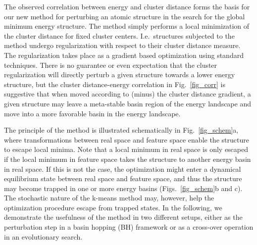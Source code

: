 \documentclass[aip,amsmath,amssymb,reprint]{revtex4-1}
\begin{document}
The observed correlation between energy and cluster distance forms the
basis for our new method for perturbing an atomic structure in the
search for the global minimum energy structure. The method simply
performs a local minimization of the cluster distance for fixed
cluster centers. I.e.\ structures subjected to the method undergo
regularization with respect to their cluster distance measure. The
regularization takes place as a gradient based optimization using
standard techniques. There is no guarantee or even expectation that the
cluster regularization will directly perturb a given structure towards
a lower energy structure, but the cluster distance-energy correlation
in Fig.\ \ref{fig_corr} is suggestive that when moved according to (minus) the cluster distance gradient, a given structure may leave a meta-stable basin
region of the energy landscape and move into a more favorable
basin in the energy landscape.

The principle of the method is illustrated schematically in
Fig.\ \ref{fig_schem}a, where transformations between real space and
feature space enable the structure to escape local minima. Note that
a local minimum in real space is only escaped if the local minimum in
feature space takes the structure to another energy basin in real
space. If this is not the case, the optimization might enter a
dynamical equilibrium state between real space and feature space, and
thus the structure may become trapped in one or more energy basins
(Figs.\ \ref{fig_schem}b and c). The stochastic nature of the k-means
method may, however, help the optimization procedure escape from trapped states.
In the following, we demonstrate the
usefulness of the method in two different setups, either as the
perturbation step in a basin hopping (BH) framework or as a cross-over
operation in an evolutionary search.
\end{document}
